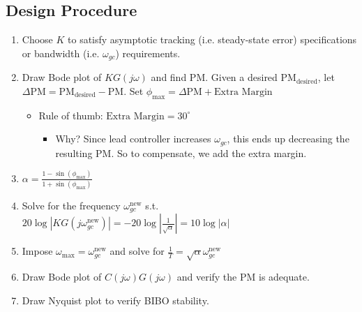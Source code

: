 \subsection{Design Procedure}
\begin{process}
    \begin{enumerate}
        \item Choose $K$ to satisfy asymptotic tracking (i.e. steady-state error) specifications or bandwidth (i.e. $\omega_{gc}$) requirements.
        \item Draw Bode plot of $K G(j \omega)$ and find PM. Given a desired $\text{PM}_{\text{desired}}$, let $\Delta \text{PM} = \text{PM}_{\text{desired}} - \text{PM}$. Set $\phi_{\max} = \Delta \text{PM} + \text{Extra Margin}$
        \begin{itemize}
            \item Rule of thumb: $\text{Extra Margin} = 30^\circ$
            \begin{itemize}
                \item Why? Since lead controller increases $\omega_{gc}$, this ends up decreasing the resulting PM. So to compensate, we add the extra margin. 
            \end{itemize}
        \end{itemize}
        \item $\alpha = \frac{1 - \sin(\phi_{\max})}{1 + \sin(\phi_{\max})}$
        \item Solve for the frequency $\omega_{gc}^{\text{new}}$ s.t. $20 \log |K G(j \omega_{gc}^{\text{new}})| = - 20 \log \left| \frac{1}{\sqrt{\alpha}} \right| = 10 \log |\alpha|$ 
        \item Impose $\omega_{\max} = \omega_{gc}^{\text{new}}$ and solve for $\frac{1}{T} = \sqrt{\alpha} \omega_{gc}^{\text{new}}$
        \item Draw Bode plot of $C(j \omega) G(j \omega)$ and verify the PM is adequate. 
        \item Draw Nyquist plot to verify BIBO stability. 
    \end{enumerate}
\end{process}


